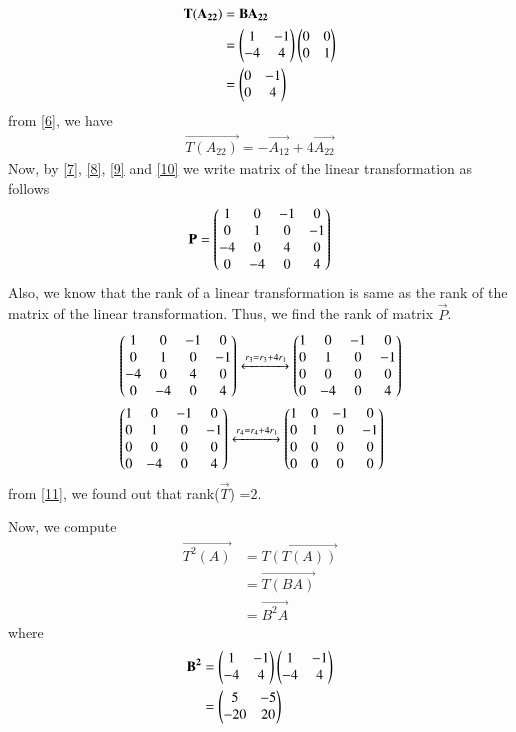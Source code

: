 \documentclass[journal,12pt,twocolumn]{IEEEtran}
\begin{document}
\begin{align}  
	\mathbf{T(A_{22})} & = \mathbf{BA_{22}} \\
	& = \begin{pmatrix}1 & -1 \\ -4 & 4\end{pmatrix}\begin{pmatrix}0 & 0 \\ 0 & 1\end{pmatrix} \\
	& = \begin{pmatrix}0 & -1 \\ 0 & 4\end{pmatrix} \label{6}
\end{align}
from \eqref{6}, we have
\begin{align}
	\vec{T(A_{22})} = -\vec{A_{12}} + 4\vec{A_{22}}\label{10}
\end{align}
Now, by \eqref{7}, \eqref{8}, \eqref{9} and \eqref{10} we write matrix of the linear transformation as follows
\begin{align}
\mathbf{P} = \begin{pmatrix}1 & 0 & -1 & 0 \\ 0 & 1 & 0 & -1 \\ -4 & 0 & 4 & 0 \\ 0 & -4 & 0 & 4 \end{pmatrix}
\end{align}
Also, we know that the rank of a linear transformation is same as the rank of the matrix of the linear transformation. Thus, we find the rank of matrix $\vec{P}$.
\begin{align}
& \begin{pmatrix}1 & 0 & -1 & 0 \\ 0 & 1 & 0 & -1 \\ -4 & 0 & 4 & 0 \\ 0 & -4 & 0 & 4\end{pmatrix}\xleftrightarrow[]{r_3= r_3 + 4r_1}  \begin{pmatrix}1 & 0 & -1 & 0 \\ 0 & 1 & 0 & -1 \\ 0 & 0 & 0 & 0 \\ 0 & -4 & 0 & 4 \end{pmatrix} \\
& \begin{pmatrix}1 & 0 & -1 & 0 \\ 0 & 1 & 0 & -1 \\ 0 & 0 & 0 & 0 \\ 0 & -4 & 0 & 4 \end{pmatrix} \xleftrightarrow[]{r_4 = r_4 + 4r_1}\begin{pmatrix}1 & 0 & -1 & 0 \\ 0 & 1 & 0 & -1 \\ 0 & 0 & 0 & 0 \\ 0 & 0 & 0 & 0 \end{pmatrix} \label{11}
\end{align}
from \eqref{11}, we found out that rank($\vec{T}$) =$2$.

Now, we compute
\begin{align}
\vec{T^2(A)} & = \vec{T(T(A))} \\
             & = \vec{T(BA)} \\
             & = \vec{B^2A}
\end{align}
where
\begin{align}
\mathbf{B^2} & = \begin{pmatrix}1 & -1 \\ -4 & 4\end{pmatrix}\begin{pmatrix}1 & -1 \\ -4 & 4\end{pmatrix} \\
          & = \begin{pmatrix}5 & -5 \\ -20 & 20\end{pmatrix}
\end{align}
\end{document}
